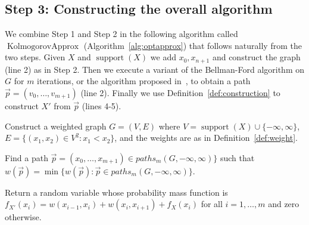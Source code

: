 \documentclass{article}
\DeclareMathOperator{\support}{support}
\DeclareMathOperator{\KlmApprox}{KolmogorovApprox}
\begin{document}
	
	\subsection*{Step 3: Constructing the overall algorithm}
	
	We combine Step 1 and Step 2 in the following algorithm called $\KlmApprox$ (Algorithm~\ref{alg:optapprox}) that follows naturally from the two steps. Given $X$ and $\support(X)$ we add $x_0,x_{n+1}$ and construct the graph (line 2) as in Step 2. Then we execute a variant of the Bellman-Ford algorithm on $G$ for $m$ iterations, or the algorithm proposed in~\cite{guerin2002computing}, to obtain a path $\vec{p}=(v_0,\dots,v_{m+1})$ (line 2). Finally we use Definition~\ref{def:construction} to construct $X'$ from $\vec{p}$ (lines 4-5).
	
	
	\begin{algorithm}\label{alg:optapprox}
		\DontPrintSemicolon
		Construct a weighted graph $G=(V,E)$ where $V=\support(X) \cup \{-\infty,\infty\}$, $E=\{(x_1,x_2) \in V^2\colon x_1 < x_2 \}$, and the weights are as in Definition~\ref{def:weight}.\;
		
		Find a path $\vec{p}=(x_0,\dots,x_{m+1})\in paths_m(G, -\infty, \infty)\}$ such that $w(\vec{p}) = \min \{w(\vec{p}) \colon \vec{p}\in paths_m(G, -\infty, \infty)\}$.   \;
		
		Return a random variable whose probability mass function is 
		$f_{X'}(x_{i}) = w(x_{i-1},x_i) + w(x_i,x_{i+1}) + f_{X}(x_i)$ for all $i=1,\dots,m$ and zero otherwise. \;
		
		\caption{$\KlmApprox (X, m)$}  
		\label{alg:sequence}
	\end{algorithm}
	
	
	
	
	
	
\end{document}
